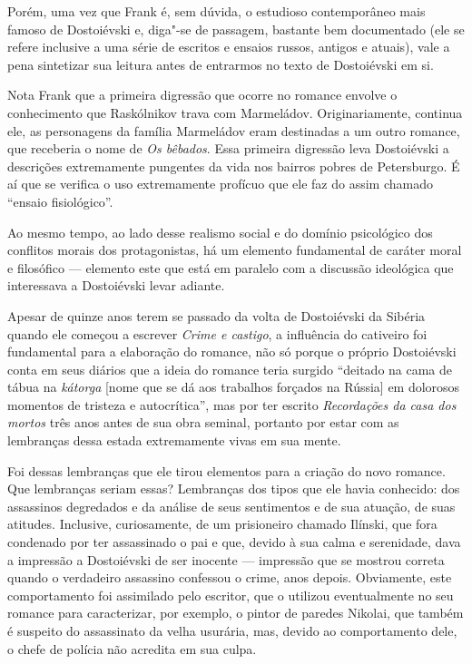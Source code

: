 Porém, uma vez que Frank é, sem dúvida, o estudioso contemporâneo mais
famoso de Dostoiévski e, diga"-se de passagem, bastante bem documentado
(ele se refere inclusive a uma série de escritos e ensaios russos,
antigos e atuais), vale a pena sintetizar sua leitura antes de entrarmos
no texto de Dostoiévski em si.

Nota Frank que a primeira digressão que ocorre no romance envolve o
conhecimento que Raskólnikov trava com Marmeládov. Originariamente,
continua ele, as personagens da família Marmeládov eram destinadas a um
outro romance, que receberia o nome de \emph{Os bêbados}. Essa primeira
digressão leva Dostoiévski a descrições extremamente pungentes da vida
nos bairros pobres de Petersburgo. É aí que se verifica o uso
extremamente profícuo que ele faz do assim chamado ``ensaio
fisiológico''.

Ao mesmo tempo, ao lado desse realismo social e do domínio psicológico
dos conflitos morais dos protagonistas, há um elemento fundamental de
caráter moral e filosófico --- elemento este que está em paralelo com a
discussão ideológica que interessava a Dostoiévski levar adiante.

Apesar de quinze anos terem se passado da volta de Dostoiévski da
Sibéria quando ele começou a escrever \emph{Crime e castigo}, a
influência do cativeiro foi fundamental para a elaboração do romance,
não só porque o próprio Dostoiévski conta em seus diários que a ideia do
romance teria surgido ``deitado na cama de tábua na \emph{kátorga}
[nome que se dá aos trabalhos forçados na Rússia] em dolorosos
momentos de tristeza e autocrítica'', mas por ter escrito
\emph{Recordações da casa dos mortos} três anos antes de sua obra
seminal, portanto por estar com as lembranças dessa estada extremamente
vivas em sua mente.

Foi dessas lembranças que ele tirou elementos para a criação do novo
romance. Que lembranças seriam essas? Lembranças dos tipos que ele havia
conhecido: dos assassinos degredados e da análise de seus sentimentos e
de sua atuação, de suas atitudes. Inclusive, curiosamente, de um
prisioneiro chamado Ilínski, que fora condenado por ter assassinado o
pai e que, devido à sua calma e serenidade, dava a impressão a
Dostoiévski de ser inocente --- impressão que se mostrou correta quando o
verdadeiro assassino confessou o crime, anos depois. Obviamente, este
comportamento foi assimilado pelo escritor, que o utilizou eventualmente
no seu romance para caracterizar, por exemplo, o pintor de paredes
Nikolai, que também é suspeito do assassinato da velha usurária, mas,
devido ao comportamento dele, o chefe de polícia não acredita em sua
culpa.

